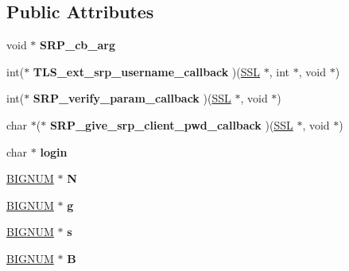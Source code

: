 \subsection*{Public Attributes}
\begin{DoxyCompactItemize}
\item 
\mbox{\label{structsrp__ctx__st_aa49970f50ded55c00d44e1601b40c9b1}} 
void $\ast$ {\bfseries S\+R\+P\+\_\+cb\+\_\+arg}
\item 
\mbox{\label{structsrp__ctx__st_a51a70bcd9e36e89c1d44bb74275ad4f3}} 
int($\ast$ {\bfseries T\+L\+S\+\_\+ext\+\_\+srp\+\_\+username\+\_\+callback} )(\hyperlink{structssl__st}{S\+SL} $\ast$, int $\ast$, void $\ast$)
\item 
\mbox{\label{structsrp__ctx__st_a3669dc44f2e7e4ed6ad7fe524187e70e}} 
int($\ast$ {\bfseries S\+R\+P\+\_\+verify\+\_\+param\+\_\+callback} )(\hyperlink{structssl__st}{S\+SL} $\ast$, void $\ast$)
\item 
\mbox{\label{structsrp__ctx__st_a800d2c5a1a2cf2f5f165e0f9c223d86b}} 
char $\ast$($\ast$ {\bfseries S\+R\+P\+\_\+give\+\_\+srp\+\_\+client\+\_\+pwd\+\_\+callback} )(\hyperlink{structssl__st}{S\+SL} $\ast$, void $\ast$)
\item 
\mbox{\label{structsrp__ctx__st_a9406590abd27d1bfb79b3f76c27b9c29}} 
char $\ast$ {\bfseries login}
\item 
\mbox{\label{structsrp__ctx__st_a207fb6e32702e2be6e8477d3acb19ddc}} 
\hyperlink{structbignum__st}{B\+I\+G\+N\+UM} $\ast$ {\bfseries N}
\item 
\mbox{\label{structsrp__ctx__st_a92c5d7f90a3fca1bbb24d6046ad69aa6}} 
\hyperlink{structbignum__st}{B\+I\+G\+N\+UM} $\ast$ {\bfseries g}
\item 
\mbox{\label{structsrp__ctx__st_aeabfb75bde4e22d7f33fa49b2ad84c3b}} 
\hyperlink{structbignum__st}{B\+I\+G\+N\+UM} $\ast$ {\bfseries s}
\item 
\mbox{\label{structsrp__ctx__st_a7849b7e0d38bddd6243e44f90bc8a48d}} 
\hyperlink{structbignum__st}{B\+I\+G\+N\+UM} $\ast$ {\bfseries B}

\end{DoxyCompactItemize}
